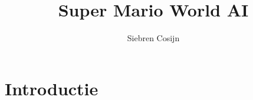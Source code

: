 \documentclass{article}
\title{Super Mario World AI}
\author{Siebren Cosijn}
\begin{document}
    \maketitle
    \section{Introductie}
\end{document}
